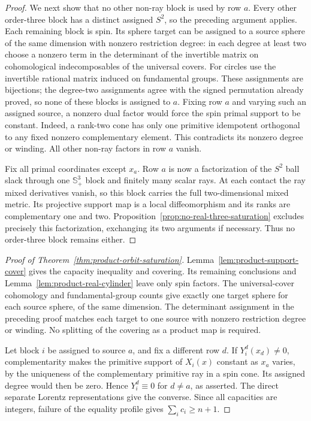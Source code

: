 \begin{proof}
We next show that no other non-ray block is used by row $a$. Every other
order-three block has a distinct assigned $S^2$, so the preceding
argument applies. Each remaining block is spin. Its sphere target can
be assigned to a source sphere of the same dimension with nonzero
restriction degree: in each degree at least two choose a nonzero
term in the determinant of the invertible matrix on cohomological
indecomposables of the universal covers. For circles use the invertible
rational matrix induced on fundamental groups. These assignments are
bijections; the degree-two assignments agree with the signed
permutation already proved, so none of these blocks is assigned to $a$.
Fixing row $a$ and varying such an assigned source, a nonzero dual
factor would force the spin primal support to be constant. Indeed,
a rank-two cone has only one primitive idempotent orthogonal to any
fixed nonzero complementary element. This contradicts its nonzero
degree or winding. All other non-ray factors in row $a$ vanish.

Fix all primal coordinates except $x_a$. Row $a$ is now a factorization
of the $S^2$ ball slack through one $\mathbb S_+^3$ block and finitely
many scalar rays. At each contact the ray mixed derivatives vanish,
so this block carries the full two-dimensional mixed metric. Its
projective support map is a local diffeomorphism and its ranks are
complementary one and two. Proposition~\ref{prop:no-real-three-saturation}
excludes precisely this factorization, exchanging its two arguments
if necessary. Thus no order-three block remains either.
\end{proof}

\begin{proof}[Proof of Theorem~\ref{thm:product-orbit-saturation}]
Lemma~\ref{lem:product-support-cover} gives the capacity inequality and
covering. Its remaining conclusions and
Lemma~\ref{lem:product-real-cylinder} leave only spin factors.
The universal-cover cohomology and fundamental-group counts give
exactly one target sphere for each source sphere, of the same dimension.
The determinant assignment in the preceding proof matches each target
to one source with nonzero restriction degree or winding. No splitting
of the covering as a product map is required.

Let block $i$ be assigned to source $a$, and fix a different row $d$.
If $Y_i^d(x_d)\ne0$, complementarity makes the primitive support of
$X_i(x)$ constant as $x_a$ varies, by the uniqueness of the complementary
primitive ray in a spin cone. Its assigned degree would then be zero.
Hence $Y_i^d\equiv0$ for $d\ne a$, as asserted. The direct separate
Lorentz representations give the converse. Since all capacities are
integers, failure of the equality profile gives $\sum_ic_i\geq n+1$.
\end{proof}

